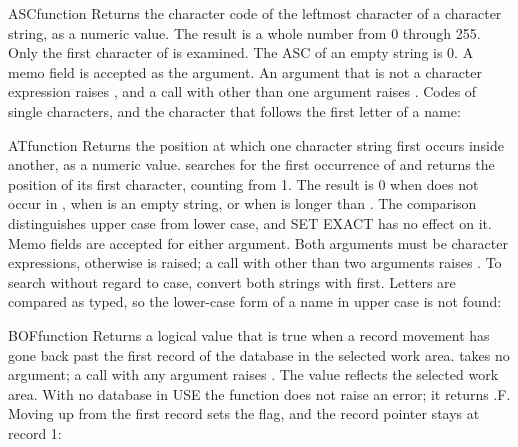\begin{XbaseEntry}{ASC}{function}
Returns the character code of the leftmost character of a character string, as a numeric value.
\Syntax
{}
\Usage
The result is a whole number from 0 through 255. Only the first character of  is examined. The ASC of an empty string is 0. A memo field is accepted as the argument. An argument that is not a character expression raises , and a call with other than one argument raises .
\Examples
Codes of single characters, and the character that follows the first letter of a name:
\end{XbaseEntry}

\begin{XbaseEntry}{AT}{function}
Returns the position at which one character string first occurs inside another, as a numeric value.
\Syntax
{}
\Usage
{} searches  for the first occurrence of  and returns the position of its first character, counting from 1. The result is 0 when  does not occur in , when  is an empty string, or when  is longer than . The comparison distinguishes upper case from lower case, and SET EXACT has no effect on it. Memo fields are accepted for either argument. Both arguments must be character expressions, otherwise  is raised; a call with other than two arguments raises .
\Tips
To search without regard to case, convert both strings with  first.
\Examples
{}
Letters are compared as typed, so the lower-case form of a name in upper case is not found:
\end{XbaseEntry}

\begin{XbaseEntry}{BOF}{function}
Returns a logical value that is true when a record movement has gone back past the first record of the database in the selected work area.
\Syntax
{}
\Usage
{} takes no argument; a call with any argument raises . The value reflects the selected work area. With no database in USE the function does not raise an error; it returns .F.
\Examples
Moving up from the first record sets the flag, and the record pointer stays at record 1:
\end{XbaseEntry}

